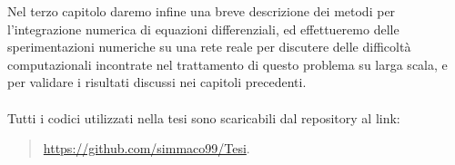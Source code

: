 \documentclass[12pt,a4paper,twoside]{report}
\begin{document}
Nel terzo capitolo daremo infine una breve descrizione dei metodi per l'integrazione numerica di equazioni differenziali, ed effettueremo delle sperimentazioni numeriche su una rete reale per discutere delle difficolt\`a computazionali incontrate nel trattamento di questo problema su larga scala, e per validare i risultati discussi nei capitoli precedenti.\\ \\
Tutti i codici utilizzati nella tesi sono scaricabili dal  repository al link:
\begin{quote}
\url{https://github.com/simmaco99/Tesi}.
\end{quote}
\cleardoublepage
\tableofcontents














\cleardoublepage
\listoffigures
{}
\listoftables
{}
\end{document}
